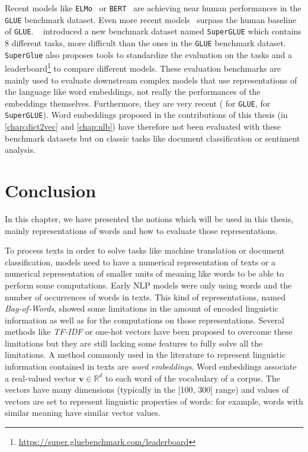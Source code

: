       Recent models like \texttt{ELMo}~\citep{peters2018elmo} or
      \texttt{BERT}~\citep{devlin2019bert} are achieving near human performances
      in the \texttt{GLUE} benchmark dataset. Even more recent
      models~\citep{colin2019t5, wang2020StructBERT} surpass the human baseline
      of \texttt{GLUE}.
      \citeauthor{wang2019superglue}~\citep{wang2019superglue} introduced a new
      benchmark dataset named \texttt{SuperGLUE} which contains 8 different
      tasks, more difficult than the ones in the \texttt{GLUE} benchmark
      dataset. \texttt{SuperGlue} also proposes tools to standardize the
      evaluation on the tasks and a
      leaderboard\footnote{\url{https://super.gluebenchmark.com/leaderboard}} to
      compare different models.  These evaluation benchmarks are mainly used to
      evaluate downstream complex models that use representations of the
      language like word embeddings, not really the performances of the
      embeddings themselves.  Furthermore, they are very recent
      (\citeyear{wang2018glue} for \texttt{GLUE}, \citeyear{wang2019superglue}
      for \texttt{SuperGLUE}). Word embeddings proposed in the contributions of
      this thesis (in \autoref{chap:dict2vec} and \autoref{chap:nlb}) have
      therefore not been evaluated with these benchmark datasets but on classic
      tasks like document classification or sentiment analysis.

\section{Conclusion}
  In this chapter, we have presented the notions which will be used in this
  thesis, mainly representations of words and how to evaluate those
  representations. \medskip

  To process texts in order to solve tasks like machine translation or document
  classification, models need to have a numerical representation of texts or a
  numerical representation of smaller units of meaning like words to be able to
  perform some computations. Early NLP models were only using words and the
  number of occurrences of words in texts. This kind of representations, named
  \textit{Bag-of-Words}, showed some limitations in the amount of encoded
  linguistic information as well as for the computations on those
  representations. Several methods like \textit{TF-IDF} or one-hot vectors have
  been proposed to overcome these limitations but they are still lacking some
  features to fully solve all the limitations. A method commonly used in the
  literature to represent linguistic information contained in texts are
  \textit{word embeddings}. Word embeddings associate a real-valued vector
  $\mathbf{v} \in \mathbb{R}^d$ to each word of the vocabulary of a corpus. The
  vectors have many dimensions (typically in the [100, 300] range) and values of
  vectors are set to represent linguistic properties of words: for example,
  words with similar meaning have similar vector values. \medskip


